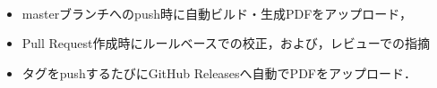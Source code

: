 \documentclass{resume}
\title{
	\gt{title}\\
}
\author{
	\gt{○○大学 ○○学科 ○○専攻 学籍番号 名前}\\
}
\date{}
\begin{document}
\maketitle

\begin{itemize}
    \item masterブランチへのpush時に自動ビルド・生成PDFをアップロード，
    \item Pull Request作成時にルールベースでの校正，および，レビューでの指摘
    \item タグをpushするたびにGitHub Releasesへ自動でPDFをアップロード．
\end{itemize}
\end{document}
